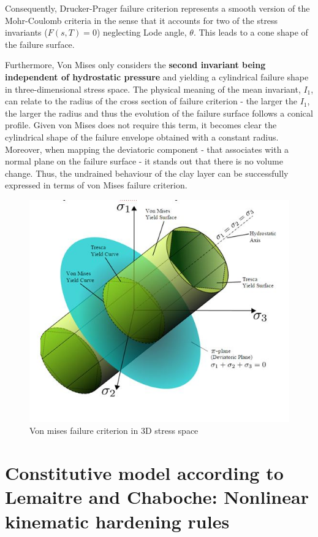 \documentclass[10pt,a4paper]{report}
\begin{document}
Consequently, Drucker-Prager failure criterion represents a smooth version of the Mohr-Coulomb criteria in the sense that it accounts for two of the stress invariants ($F (s, T) = 0$) neglecting Lode angle, $\theta$. This leads to a cone shape of the failure surface. 

Furthermore, Von Mises only considers the \textbf{second invariant being independent of hydrostatic pressure }and yielding a cylindrical failure shape in three-dimensional stress space. The physical meaning of the mean invariant, $I_1$, can relate to the radius of the cross section of failure criterion - the larger the $I_1$, the larger the radius and thus the evolution of the failure surface follows a conical profile. Given von Mises does not require this term,  it becomes clear the cylindrical shape of the failure envelope obtained with a constant radius. Moreover, when mapping the deviatoric component - that associates with a normal plane on the failure surface - it stands out that there is no volume change. Thus, the undrained behaviour of the clay layer can be successfully expressed in terms of von Mises failure criterion. 

\begin{figure}[h!]
	\centering
	\includegraphics[width=0.8\linewidth]{"Mises"}
	\caption{Von mises failure criterion in 3D stress space}
	\label{Mises}
\end{figure}

\section{Constitutive model according to Lemaitre and Chaboche: Nonlinear kinematic hardening rules }
\end{document}
